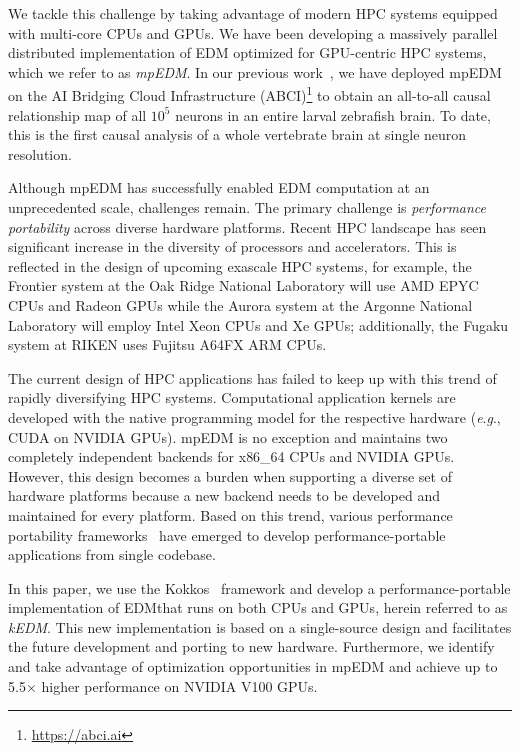 \documentclass[sigconf]{acmart}
\begin{document}
We tackle this challenge by taking advantage of modern HPC systems equipped
with multi-core CPUs and GPUs. We have been developing a massively
parallel distributed implementation of EDM optimized for GPU-centric HPC
systems, which we refer to as \textit{mpEDM}. In our previous work~\cite{mpedm}, we have deployed mpEDM on the AI
Bridging Cloud Infrastructure (ABCI)\footnote{\url{https://abci.ai}} to
obtain an all-to-all causal relationship map of all $10^5$ neurons in an
entire larval zebrafish brain. To date, this is the first causal analysis
of a whole vertebrate brain at single neuron resolution.

Although mpEDM has successfully enabled EDM computation at an unprecedented
scale, challenges remain. The primary challenge is
\textit{performance portability} across diverse hardware platforms. Recent HPC
landscape has seen significant increase in the diversity of processors and
accelerators. This is reflected in the design of upcoming exascale HPC systems, for example,
the Frontier system at the Oak Ridge National Laboratory will use AMD EPYC
CPUs and Radeon GPUs while the Aurora system at the Argonne National
Laboratory will employ Intel Xeon CPUs and Xe GPUs; additionally, the Fugaku system at RIKEN
uses Fujitsu A64FX ARM CPUs.

The current design of HPC applications has failed to keep up with this trend
of rapidly diversifying HPC systems. Computational application kernels are developed with the native programming model for the
respective hardware (\textit{e}.\textit{g}., CUDA on NVIDIA GPUs). mpEDM is no exception and
maintains two completely independent backends for x86\_64 CPUs and NVIDIA
GPUs. However, this design becomes a burden when supporting a diverse set of
hardware platforms because a new backend needs to be developed and maintained
for every platform. Based on this trend, various performance portability
frameworks~\cite{Deakin2019, Deakin2020} have emerged to develop
performance-portable applications from single codebase.

In this paper, we use the Kokkos~\cite{Edwards2014} framework and develop a performance-portable implementation of EDM\@ that runs on
both CPUs and GPUs, herein referred to as \textit{kEDM}. This new implementation is based on a single-source design and
facilitates the future development and porting to new hardware. Furthermore,
we identify and take advantage of optimization opportunities in mpEDM and
achieve up to 5.5$\times$ higher performance on NVIDIA V100 GPUs.
\end{document}
